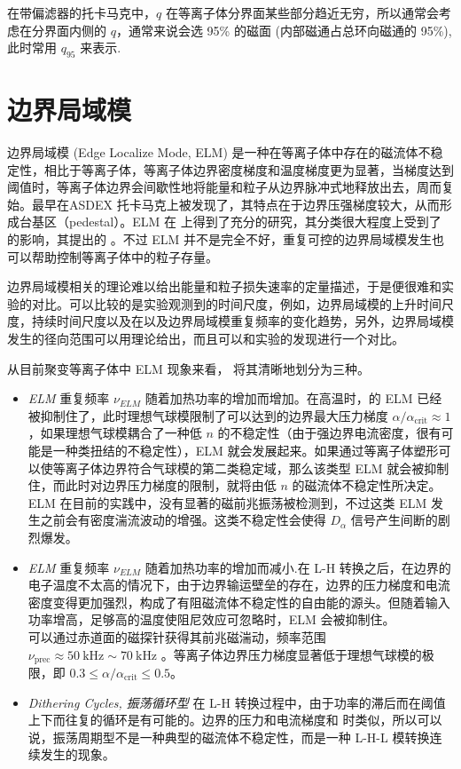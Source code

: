 在带偏滤器的托卡马克中，$q$ 在等离子体分界面某些部分趋近无穷，所以通常会考虑在分界面内侧的 $q$，通常来说会选 95\% 的磁面 (内部磁通占总环向磁通的 95\%), 此时常用 $q_{95}$ 来表示.





\section{边界局域模}
边界局域模 (Edge Localize Mode, ELM) 是一种在\Hmode 等离子体中存在的磁流体不稳定性，相比于\Lmode 等离子体，\Hmode 等离子体边界密度梯度和温度梯度更为显著，当梯度达到阈值时，等离子体边界会间歇性地将能量和粒子从边界脉冲式地释放出去，周而复始。\Hmode 最早在ASDEX 托卡马克上被发现了，其特点在于边界压强梯度较大，从而形成台基区（pedestal）。ELM 在 \ddd 上得到了充分的研究，其分类很大程度上受到了 \ddd 的影响，其提出的 。不过 ELM 并不是完全不好，重复可控的边界局域模发生也可以帮助控制等离子体中的粒子存量。



边界局域模相关的理论难以给出能量和粒子损失速率的定量描述，于是便很难和实验的对比。可以比较的是实验观测到的时间尺度，例如，边界局域模的上升时间尺度，持续时间尺度以及在以及边界局域模重复频率的变化趋势，另外，边界局域模发生的径向范围可以用理论给出，而且可以和实验的发现进行一个对比。

从目前聚变等离子体中 ELM 现象来看，\cite{zohm_edge_1996} 将其清晰地划分为三种。


\begin{itemize}
    \item \textit{\typeone ELM}  重复频率 $\nu_{ELM}$ 随着加热功率的增加而增加。在高温时，\typethr 的 ELM 已经被抑制住了，此时理想气球模限制了可以达到的边界最大压力梯度 $\alpha/\alpha_{\text{crit}}\approx 1$，如果理想气球模耦合了一种低 $n$ 的不稳定性（由于强边界电流密度，很有可能是一种类扭结的不稳定性），\typethr ELM 就会发展起来。如果通过等离子体塑形可以使等离子体边界符合气球模的第二类稳定域，那么该类型 ELM 就会被抑制住，而此时对边界压力梯度的限制，就将由低 $n$ 的磁流体不稳定性所决定。\\
    ELM 在目前的实践中，没有显著的磁前兆振荡被检测到，不过这类 ELM 发生之前会有密度湍流波动的增强。这类不稳定性会使得 $D_\alpha$ 信号产生间断的剧烈爆发。
    \item \textit{\typethr ELM} 重复频率 $\nu_{ELM}$ 随着加热功率的增加而减小.在 L-H 转换之后，在边界的电子温度不太高的情况下，由于边界输运壁垒的存在，边界的压力梯度和电流密度变得更加强烈，构成了有阻磁流体不稳定性的自由能的源头。但随着输入功率增高，足够高的温度使阻尼效应可忽略时，\typethr ELM 会被抑制住。\\
    可以通过赤道面的磁探针获得其前兆磁湍动，频率范围 $\nu_{\text{prec}}\approx \SI{50}{\kilo\hertz} \sim \SI{70}{\kilo\hertz}$ 。等离子体边界压力梯度显著低于理想气球模的极限，即 $0.3\leq \alpha/\alpha_{\text{crit}}\leq 0.5$。
    \item \textit{Dithering Cycles, 振荡循环型} 在 L-H 转换过程中，由于\Hmode 功率的滞后而在阈值上下而往复的循环是有可能的。边界的压力和电流梯度和 \Lmode 时类似，所以可以说，振荡周期型不是一种典型的磁流体不稳定性，而是一种 L-H-L 模转换连续发生的现象。
\end{itemize}

